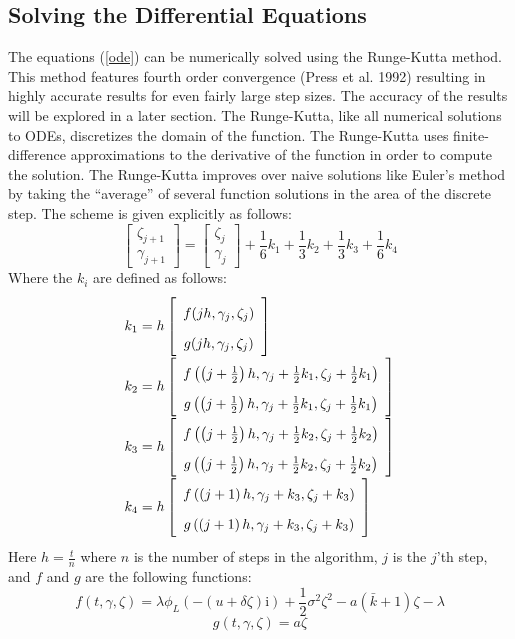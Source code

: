 \documentclass{article}
\theoremstyle{definition}
\begin{document}
\subsection{Solving the Differential Equations}
The equations (\ref{ode}) can be numerically solved using the Runge-Kutta method. This method features fourth order convergence (Press et al. 1992) resulting in highly accurate results for even fairly large step sizes.  The accuracy of the results will be explored in a later section. The Runge-Kutta, like all numerical solutions to ODEs, discretizes the domain of the function.  The Runge-Kutta uses finite-difference approximations to the derivative of the function in order to compute the solution.  The Runge-Kutta improves over naive solutions like Euler's method by taking the ``average'' of several function solutions in the area of the discrete step.  The scheme is given explicitly as follows:
\[
\left[\begin{array}{c}
\zeta_{j+1} \\
\gamma_{j+1}
\end{array}\right] =
 \left[\begin{array}{c}
\zeta_{j}\\
\gamma_j
\end{array} \right]
+\frac{1}{6}k_1+\frac{1}{3} k_2+\frac{1}{3} k_3+\frac{1}{6} k_4
\]
Where the \(k_i\) are defined as follows:
\[\def\arraystretch{1.8}\begin{array}{l} 
k_1=h \left[\begin{array}{c} f(jh, \gamma_j, \zeta_j) \\ g(jh, \gamma_j, \zeta_j) \end{array} \right] \\
k_2= h \left[\begin{array}{c} f\left(\left(j+\frac{1}{2}\right)h, \gamma_j+\frac{1}{2}k_1, \zeta_j + \frac{1}{2} k_1\right) \\ g\left(\left(j+\frac{1}{2}\right)h, \gamma_j+\frac{1}{2}k_1, \zeta_j + \frac{1}{2} k_1\right) \end{array} \right]\\
k_3= h \left[\begin{array}{c} f\left(\left(j+\frac{1}{2}\right)h, \gamma_j+\frac{1}{2}k_2, \zeta_j + \frac{1}{2} k_2\right) \\ g\left(\left(j+\frac{1}{2}\right)h, \gamma_j+\frac{1}{2}k_2, \zeta_j + \frac{1}{2} k_2\right) \end{array}\right]\\
k_4= h \left[\begin{array}{c} f\left(\left(j+1\right)h, \gamma_j+k_3, \zeta_j +  k_3\right) \\ g\left(\left(j+1\right)h, \gamma_j+k_3, \zeta_j +  k_3\right) \end{array} \right]
\end{array}
\]
Here \(h=\frac{t}{n}\) where \(n\) is the number of steps in the algorithm, \(j\) is the \(j\)'th step, and \(f\) and \(g\) are the following functions:
\[f(t, \gamma, \zeta)=\lambda\phi_L(-(u+\delta \zeta)\mathrm{i})+\frac{1}{2} \sigma^2 \zeta^2 -a(\bar{k}+1) \zeta-\lambda\]
\[g(t, \gamma, \zeta)=a\zeta\]
\end{document}
